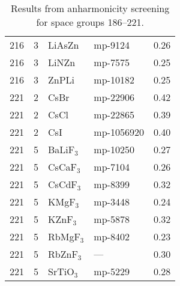 \begin{table*}[t]
\begin{center}
\begin{tabular}{rrllr}
         216 &            3 &       LiAsZn &    mp-9124 &       0.26 \\
         216 &            3 &        LiNZn &    mp-7575 &       0.25 \\
         216 &            3 &        ZnPLi &   mp-10182 &       0.25 \\
         221 &            2 &         CsBr &   mp-22906 &       0.42 \\
         221 &            2 &         CsCl &   mp-22865 &       0.39 \\
         221 &            2 &          CsI & mp-1056920 &       0.40 \\
         221 &            5 &    BaLiF$_3$ &   mp-10250 &       0.27 \\
         221 &            5 &    CsCaF$_3$ &    mp-7104 &       0.26 \\
         221 &            5 &    CsCdF$_3$ &    mp-8399 &       0.32 \\
         221 &            5 &     KMgF$_3$ &    mp-3448 &       0.24 \\
         221 &            5 &     KZnF$_3$ &    mp-5878 &       0.32 \\
         221 &            5 &    RbMgF$_3$ &    mp-8402 &       0.23 \\
         221 &            5 &    RbZnF$_3$ &    ---     &       0.30 \\
         221 &            5 &    SrTiO$_3$ &    mp-5229 &       0.28 \\
         
\bottomrule
\end{tabular}
\end{center}
   \caption{Results from anharmonicity screening for space groups 186--221.}
   \label{tab:screening.sigma.2}
 \end{table*}         
  
